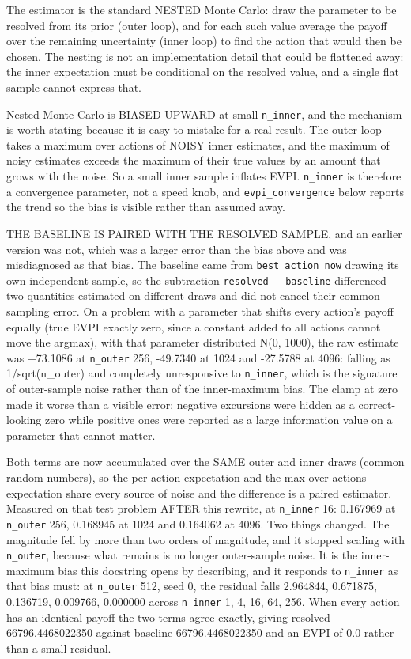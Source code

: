 \documentclass[10pt,a4paper,twoside]{report}
\begin{document}
The estimator is the standard NESTED Monte Carlo: draw the parameter to be resolved from its prior (outer loop), and for each such value average the payoff over the remaining uncertainty (inner loop) to find the action that would then be chosen. The nesting is not an implementation detail that could be flattened away: the inner expectation must be conditional on the resolved value, and a single flat sample cannot express that.

Nested Monte Carlo is BIASED UPWARD at small \texttt{n\_inner}, and the mechanism is worth stating because it is easy to mistake for a real result. The outer loop takes a maximum over actions of NOISY inner estimates, and the maximum of noisy estimates exceeds the maximum of their true values by an amount that grows with the noise. So a small inner sample inflates EVPI. \texttt{n\_inner} is therefore a convergence parameter, not a speed knob, and \texttt{evpi\_convergence} below reports the trend so the bias is visible rather than assumed away.

THE BASELINE IS PAIRED WITH THE RESOLVED SAMPLE, and an earlier version was not, which was a larger error than the bias above and was misdiagnosed as that bias. The baseline came from \texttt{best\_action\_now} drawing its own independent sample, so the subtraction \texttt{resolved - baseline} differenced two quantities estimated on different draws and did not cancel their common sampling error. On a problem with a parameter that shifts every action's payoff equally (true EVPI exactly zero, since a constant added to all actions cannot move the argmax), with that parameter distributed N(0, 1000), the raw estimate was +73.1086 at \texttt{n\_outer} 256, -49.7340 at 1024 and -27.5788 at 4096: falling as 1/sqrt(n\_outer) and completely unresponsive to \texttt{n\_inner}, which is the signature of outer-sample noise rather than of the inner-maximum bias. The clamp at zero made it worse than a visible error: negative excursions were hidden as a correct-looking zero while positive ones were reported as a large information value on a parameter that cannot matter.

Both terms are now accumulated over the SAME outer and inner draws (common random numbers), so the per-action expectation and the max-over-actions expectation share every source of noise and the difference is a paired estimator. Measured on that test problem AFTER this rewrite, at \texttt{n\_inner} 16: 0.167969 at \texttt{n\_outer} 256, 0.168945 at 1024 and 0.164062 at 4096. Two things changed. The magnitude fell by more than two orders of magnitude, and it stopped scaling with \texttt{n\_outer}, because what remains is no longer outer-sample noise. It is the inner-maximum bias this docstring opens by describing, and it responds to \texttt{n\_inner} as that bias must: at \texttt{n\_outer} 512, seed 0, the residual falls 2.964844, 0.671875, 0.136719, 0.009766, 0.000000 across \texttt{n\_inner} 1, 4, 16, 64, 256. When every action has an identical payoff the two terms agree exactly, giving resolved 66796.4468022350 against baseline 66796.4468022350 and an EVPI of 0.0 rather than a small residual.
\end{document}
